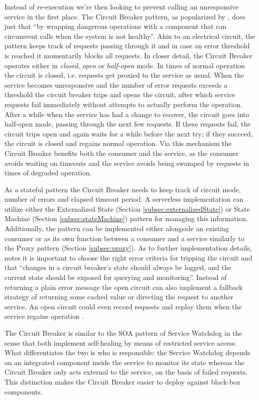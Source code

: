 Instead of re-execution we're then looking to prevent calling an unresponsive service in the first place. The Circuit Breaker pattern, as popularized by \textcite{nygard07releaseIt}, does just that ``by wrapping dangerous operations with a component that can circumvent calls when the system is not healthy''. Akin to an electrical circuit, the pattern keeps track of requests passing through it and in case an error threshold is reached it momentarily blocks all requests. In closer detail, the Circuit Breaker operates either in \textit{closed}, \textit{open} or \textit{half-open} mode. In times of normal operation the circuit is closed, i.e. requests get proxied to the service as usual. When the service becomes unresponsive and the number of error requests exceeds a threshold the circuit breaker trips and opens the circuit, after which service requests fail immediately without attempts to actually perform the operation. After a while when the service has had a change to recover, the circuit goes into half-open mode, passing through the next few requests. If these requests fail, the circuit trips open and again waits for a while before the next try; if they succeed, the circuit is closed and regains normal operation. Via this mechanism the Circuit Breaker benefits both the consumer and the service, as the consumer avoids waiting on timeouts and the service avoids being swamped by requests in times of degraded operation.

As a stateful pattern the Circuit Breaker needs to keep track of circuit mode, number of errors and elapsed timeout period. A serverless implementation can utilize either the Externalized State (Section \ref{subsec:externalizedState}) or State Machine (Section \ref{subsec:stateMachine}) pattern for managing this information. Additionally, the pattern can be implemented either alongside an existing consumer or as its own function between a consumer and a service similarly to the Proxy pattern (Section \ref{subsec:proxy}). As to further implementation details, \textcite{nygard07releaseIt} notes it is important to choose the right error criteria for tripping the circuit and that ``changes in a circuit breaker’s state should always be logged, and the current state should be exposed for querying and monitoring''. Instead of returning a plain error message the open circuit can also implement a fallback strategy of returning some cached value or directing the request to another service. An open circuit could even record requests and replay them when the service regains operation \parencite{microsoft18cloudPatterns}.

The Circuit Breaker is similar to the SOA pattern of Service Watchdog \parencite{rotem12soa} in the sense that both implement self-healing by means of restricted service access. What differentiates the two is who is responsible: the Service Watchdog depends on an integrated component inside the service to monitor its state whereas the Circuit Breaker only acts external to the service, on the basis of failed requests. This distinction makes the Circuit Breaker easier to deploy against black-box components.
